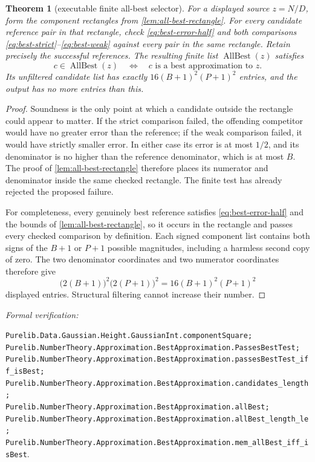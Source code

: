 \documentclass[11pt]{article}
\newtheorem{theorem}{Theorem}[section]
\newcommand{\leanref}[1]{\par\smallskip\noindent
  \emph{Formal verification:}\par\nobreak
  {\raggedright\nolinkurl{#1}.\par}}
\begin{document}
\begin{theorem}[executable finite all-best selector]
\label{thm:all-best-selector}
For a displayed source $z=N/D$, form the component rectangles from
\cref{lem:all-best-rectangle}.  For every candidate reference pair in that
rectangle, check \eqref{eq:best-error-half} and both comparisons
\eqref{eq:best-strict}--\eqref{eq:best-weak} against every pair in the same
rectangle.  Retain precisely the successful references.  The resulting
finite list $\operatorname{AllBest}(z)$ satisfies
\begin{equation}
\label{eq:all-best-membership}
 c\in\operatorname{AllBest}(z)
       \quad\Longleftrightarrow\quad
 c\text{ is a best approximation to }z.
\end{equation}
Its unfiltered candidate list has exactly
$16(B+1)^2(P+1)^2$ entries, and the output has no more entries than this.
\end{theorem}

\begin{proof}
Soundness is the only point at which a candidate outside the rectangle could
appear to matter.  If the strict comparison failed, the offending competitor
would have no greater error than the reference; if the weak comparison
failed, it would have strictly smaller error.  In either case its error is at
most $1/2$, and its denominator is no higher than the reference denominator,
which is at most $B$.  The proof of
\cref{lem:all-best-rectangle} therefore places its numerator and denominator
inside the same checked rectangle.  The finite test has already rejected the
proposed failure.

For completeness, every genuinely best reference satisfies
\eqref{eq:best-error-half} and the bounds of
\cref{lem:all-best-rectangle}, so it occurs in the rectangle and passes every
checked comparison by definition.  Each signed component list contains both
signs of the $B+1$ or $P+1$ possible magnitudes, including a harmless second
copy of zero.  The two denominator coordinates and two numerator coordinates
therefore give
\[
       \bigl(2(B+1)\bigr)^2\bigl(2(P+1)\bigr)^2
        =16(B+1)^2(P+1)^2
\]
displayed entries.  Structural filtering cannot increase their number.
\end{proof}

\leanref{Purelib.Data.Gaussian.Height.GaussianInt.componentSquare;
Purelib.NumberTheory.Approximation.BestApproximation.PassesBestTest;
Purelib.NumberTheory.Approximation.BestApproximation.passesBestTest_iff_isBest;
Purelib.NumberTheory.Approximation.BestApproximation.candidates_length;
Purelib.NumberTheory.Approximation.BestApproximation.allBest;
Purelib.NumberTheory.Approximation.BestApproximation.allBest_length_le;
Purelib.NumberTheory.Approximation.BestApproximation.mem_allBest_iff_isBest}
\end{document}
